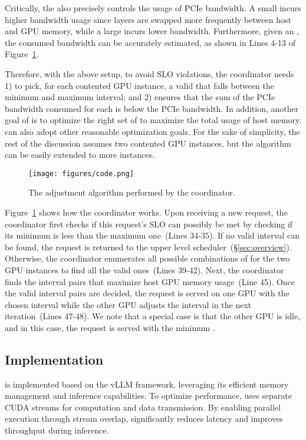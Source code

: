 Critically, the \interval also 
precisely controls the usage of PCIe bandwidth. 
%
A small \interval incurs higher bandwidth usage since layers are swapped more frequently between host and GPU memory, while a large \interval incurs lower bandwidth. 
%
Furthermore, given an \interval, the consumed bandwidth can be accurately estimated, as shown in Lines 4-13 of Figure~\ref{fig:code}. 

Therefore, with the above setup, to avoid SLO violations, the coordinator needs 1) to pick, for each contented GPU instance, 
a valid \interval that falls between the minimum and maximum interval; 
%
and 2) ensures that the sum of the PCIe bandwidth consumed for each \interval 
is below the PCIe bandwidth. 
%
In addition, another goal of \sys is to optimize the right set of \interval to maximize the total usage of host memory. 
%
\sys can also adopt other reasonable optimization goals. 
%
For the sake of simplicity, the rest of the discussion assumes two contented 
GPU instances, but the algorithm can be easily extended to more instances. 

\begin{figure}[t]
    \centering
    \texttt{[image: figures/code.png]}
    \caption{The adjustment algorithm performed by the coordinator. }
    \label{fig:code}
\end{figure}

%
Figure~\ref{fig:code} shows how the coordinator works. 
%
Upon receiving a new request, the coordinator first checks if this request's SLO can possibly be met by checking if its minimum \interval is less than the maximum one~(Lines 34-35).  
%
If no valid interval can be found, the request is returned to the upper level 
scheduler~(\S\ref{sec:overview}). 
%
Otherwise, the coordinator enumerates all possible combinations of \intervals for the two GPU instances to find all the valid ones~(Lines 39-42). 
%
Next, the coordinator finds the interval pairs that maximize host GPU memory 
usage~(Line 45). 
%
Once the valid interval pairs are decided, the request is served on one GPU 
with the chosen interval while the other GPU adjusts the interval in the next 
iteration~(Lines 47-48). 
%
We note that a special case is that the other GPU is idle, and in this case, 
the request is served with the minimum \interval. 
%

\subsection{Implementation}
%
\sys is implemented based on the vLLM framework, leveraging its efficient memory management and inference capabilities. 
To optimize performance, \sys uses separate CUDA streams for computation and data transmission. 
By enabling parallel execution through stream overlap, \sys significantly reduces latency and improves throughput during inference.

